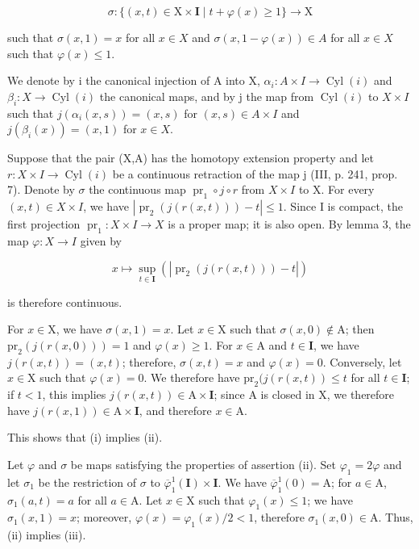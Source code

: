 \[
\sigma \colon \{(x, t) \in \mathrm{X} \times \mathbf {I} \mid t + \varphi (x) \geqslant 1 \} \to \mathrm{X}
\]

such that \(\sigma(x,1) = x\) for all \(x \in X\) and \(\sigma(x,1 - \varphi(x)) \in A\) for all \(x \in X\) such that \(\varphi(x) \leqslant 1\).

We denote by i the canonical injection of A into X, \(\alpha_{i}\colon A\times I\to\operatorname{Cyl}(i)\) and \(\beta_{i}\colon X\to\operatorname{Cyl}(i)\) the canonical maps, and by j the map from \(\operatorname{Cyl}(i)\) to \(X\times I\) such that \(j(\alpha_{i}(x,s))=(x,s)\) for \((x,s)\in A\times I\) and \(j(\beta_{i}(x))=(x,1)\) for \(x\in X\).

Suppose that the pair (X,A) has the homotopy extension property and let \(r:X\times I\to\operatorname{Cyl}(i)\) be a continuous retraction of the map j (III, p. 241, prop. 7). Denote by \(\sigma\) the continuous map \(\operatorname{pr}_1\circ j\circ r\) from \(X\times I\) to X. For every \((x,t)\in X\times I\), we have \(|\operatorname{pr}_2(j(r(x,t)))-t|\leqslant1\). Since I is compact, the first projection \(\operatorname{pr}_1:X\times I\to X\) is a proper map; it is also open. By lemma 3, the map \(\varphi:X\to I\) given by

\[
x \mapsto \sup _ {t \in \mathbf {I}} \left(\left| \operatorname{pr} _ {2} (j (r (x, t))) - t \right|\right)
\]

is therefore continuous.

For \(x \in \mathrm{X}\), we have \(\sigma(x,1) = x\). Let \(x \in \mathrm{X}\) such that \(\sigma(x,0) \notin \mathrm{A}\); then \(\mathrm{pr}_2(j(r(x,0))) = 1\) and \(\varphi(x) \geqslant 1\). For \(x \in \mathrm{A}\) and \(t \in \mathbf{I}\), we have \(j(r(x,t)) = (x,t)\); therefore, \(\sigma(x,t) = x\) and \(\varphi(x) = 0\). Conversely, let \(x \in \mathrm{X}\) such that \(\varphi(x) = 0\). We therefore have \(\mathrm{pr}_2(j(r(x,t)) \leqslant t\) for all \(t \in \mathbf{I}\); if \(t < 1\), this implies \(j(r(x,t)) \in \mathrm{A} \times \mathbf{I}\); since A is closed in X, we therefore have \(j(r(x,1)) \in \mathrm{A} \times \mathbf{I}\), and therefore \(x \in \mathrm{A}\).

This shows that (i) implies (ii).

Let \(\varphi\) and \(\sigma\) be maps satisfying the properties of assertion (ii). Set \(\varphi_1 = 2\varphi\) and let \(\sigma_1\) be the restriction of \(\sigma\) to \(\overline{\varphi}_1^1 (\mathbf{I})\times \mathbf{I}\). We have \(\overline{\varphi}_1^1 (0) = \mathrm{A}\); for \(a\in \mathrm{A}\), \(\sigma_1(a,t) = a\) for all \(a\in \mathrm{A}\). Let \(x\in \mathrm{X}\) such that \(\varphi_{1}(x)\leqslant 1\); we have \(\sigma_1(x,1) = x\); moreover, \(\varphi (x) = \varphi_{1}(x) / 2 < 1\), therefore \(\sigma_{1}(x,0)\in \mathrm{A}\). Thus, (ii) implies (iii).

